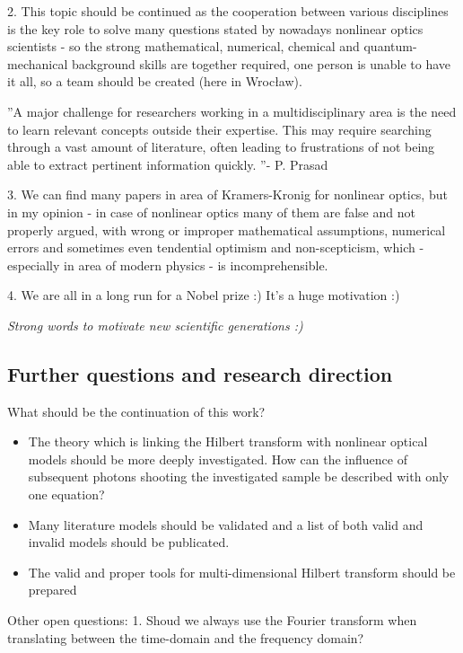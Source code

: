 \documentclass[12pt,twoside,a4paper]{article}
\numberwithin{equation}{subsection}
\numberwithin{figure}{subsection}
\begin{document}
2. This topic should be continued as the cooperation between various disciplines is the key role to solve many questions stated
by nowadays nonlinear optics scientists - so the strong mathematical, numerical, chemical and quantum-mechanical background skills
are together required, one person is unable to have it all, so a team should be created (here in Wrocław).

''A major challenge for researchers working in a multidisciplinary area is the need to learn relevant concepts outside their
expertise. This may require searching through a vast amount of literature, often leading to frustrations of not being able to
extract pertinent information quickly. ''- P. Prasad \cite{prasad_nanophotonics}

3. We can find many papers in area of Kramers-Kronig for nonlinear optics, but in my opinion - in case of nonlinear optics many of
them are false and not properly argued, with wrong or improper mathematical assumptions, numerical errors and sometimes even
tendential optimism and non-scepticism, which - especially in area of modern physics - is incomprehensible.

4. We are all in a long run for a Nobel prize :) It's a huge motivation :)

\textit{Strong words to motivate new scientific generations :)}

\subsection{Further questions and research direction} \label{chap:conclusion_further}

What should be the continuation of this work?

\begin{itemize} 
	\item The theory which is linking the Hilbert transform with nonlinear optical models should be more deeply investigated. How can
	the influence of subsequent photons shooting the investigated sample be described with only one equation?
	\item Many literature models should be validated and a list of both valid and invalid models should be publicated.
	\item The valid and proper tools for multi-dimensional Hilbert transform should be prepared
\end{itemize}


Other open questions:
1. Shoud we always use the Fourier transform when translating between the time-domain and the frequency domain?
\end{document}
